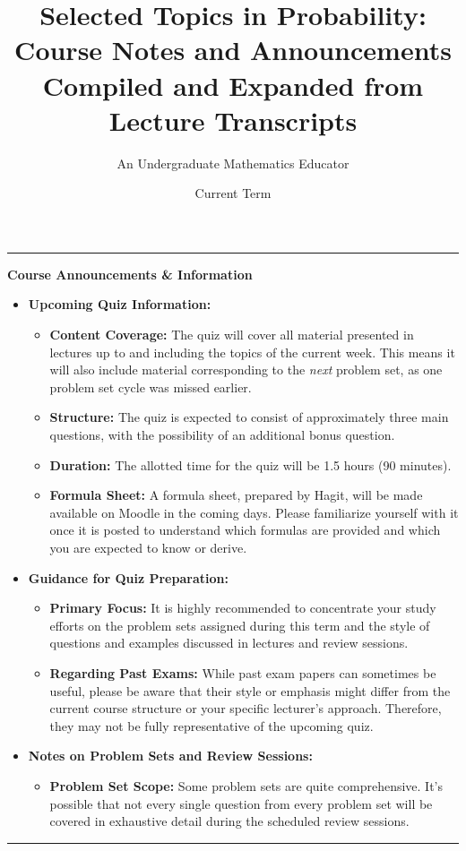 \documentclass[11pt, letterpaper]{article}
\title{Selected Topics in Probability: \\ Course Notes and Announcements \\ \large Compiled and Expanded from Lecture Transcripts}
\author{An Undergraduate Mathematics Educator} %
\date{Current Term} %
\theoremstyle{plain} %
\theoremstyle{definition} %
\theoremstyle{remark} %
\newenvironment{courseannouncements}
  {\par\bigskip\noindent\begin{center}\rule{\textwidth}{0.4pt}\end{center}\par\nobreak\medskip\noindent\textbf{Course Announcements \& Information}\par\nobreak\medskip\begin{itemize}[leftmargin=*]}
  {\end{itemize}\par\nobreak\medskip\noindent\begin{center}\rule{\textwidth}{0.4pt}\end{center}\par\bigskip}
\begin{document}
\maketitle
\tableofcontents
\clearpage

\begin{courseannouncements}
    \item \textbf{Upcoming Quiz Information:}
    \begin{itemize}
        \item \textbf{Content Coverage:} The quiz will cover all material presented in lectures up to and including the topics of the current week. This means it will also include material corresponding to the \textit{next} problem set, as one problem set cycle was missed earlier.
        \item \textbf{Structure:} The quiz is expected to consist of approximately three main questions, with the possibility of an additional bonus question.
        \item \textbf{Duration:} The allotted time for the quiz will be 1.5 hours (90 minutes).
        \item \textbf{Formula Sheet:} A formula sheet, prepared by Hagit, will be made available on Moodle in the coming days. Please familiarize yourself with it once it is posted to understand which formulas are provided and which you are expected to know or derive.
    \end{itemize}
    \item \textbf{Guidance for Quiz Preparation:}
    \begin{itemize}
        \item \textbf{Primary Focus:} It is highly recommended to concentrate your study efforts on the problem sets assigned during this term and the style of questions and examples discussed in lectures and review sessions.
        \item \textbf{Regarding Past Exams:} While past exam papers can sometimes be useful, please be aware that their style or emphasis might differ from the current course structure or your specific lecturer's approach. Therefore, they may not be fully representative of the upcoming quiz.
    \end{itemize}
    \item \textbf{Notes on Problem Sets and Review Sessions:}
    \begin{itemize}
        \item \textbf{Problem Set Scope:} Some problem sets are quite comprehensive. It's possible that not every single question from every problem set will be covered in exhaustive detail during the scheduled review sessions.

\end{itemize}
\end{courseannouncements}
\end{document}
